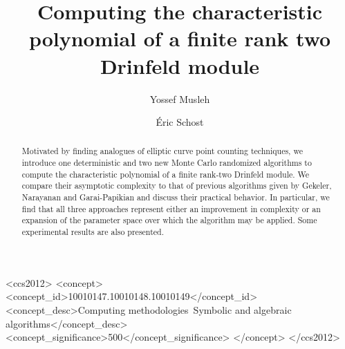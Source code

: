 \documentclass[sigconf]{acmart}
\begin{document}
\title{Computing the characteristic polynomial of a finite rank two Drinfeld module}

\author{Yossef Musleh}

\author{\'Eric Schost}



\begin{abstract}
  Motivated by finding analogues of elliptic curve point counting
  techniques, we introduce one deterministic and two new Monte Carlo
  randomized algorithms to compute the characteristic polynomial of a
  finite rank-two Drinfeld module. We compare their asymptotic
  complexity to that of previous algorithms given by Gekeler,
  Narayanan and Garai-Papikian and discuss their practical
  behavior. In particular, we find that all three approaches represent
  either an improvement in complexity or an expansion of the parameter
  space over which the algorithm may be applied. Some experimental
  results are also presented.
\end{abstract}

\begin{CCSXML}
<ccs2012>
<concept>
<concept_id>10010147.10010148.10010149</concept_id>
<concept_desc>Computing methodologies~Symbolic and algebraic algorithms</concept_desc>
<concept_significance>500</concept_significance>
</concept>
</ccs2012>
\end{CCSXML}




\setcounter{secnumdepth}{4}
\renewcommand{\theparagraph}{\thesubsection.\arabic{paragraph}}
\titleformat{\paragraph}[runin]{\normalfont\normalsize\bfseries}{\theparagraph.}{1em}{}
\titlespacing*{\paragraph}{0em}{1ex}{1em}
\newcommand{\pref}[1]{{\bf\ref{#1}}}
\end{document}
